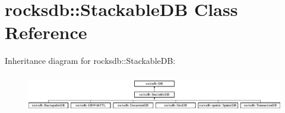 \hypertarget{classrocksdb_1_1StackableDB}{}\section{rocksdb\+:\+:Stackable\+DB Class Reference}
\label{classrocksdb_1_1StackableDB}
Inheritance diagram for rocksdb\+:\+:Stackable\+DB\+:\begin{figure}[H]
\begin{center}
\leavevmode
\includegraphics[height=1.666667cm]{classrocksdb_1_1StackableDB}
\end{center}
\end{figure}
